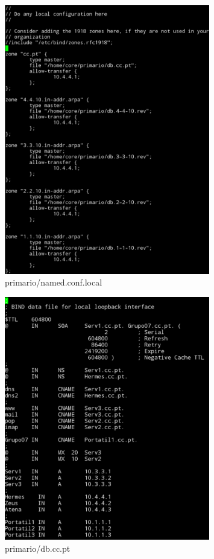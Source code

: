 \documentclass[a4paper]{report}
\begin{document}
\begin{figure}[H]
    \centering 
    \includegraphics[width=0.8\textwidth]{images/primary_ncl.png}  
    \caption{primario/named.conf.local}
    \label{fig:primary_ncl}
\end{figure}

\begin{figure}[H]
    \centering 
    \includegraphics[width=0.8\textwidth]{images/dbccpt.png}  
    \caption{primario/db.cc.pt}
    \label{fig:dbccpt}
\end{figure}
\end{document}
